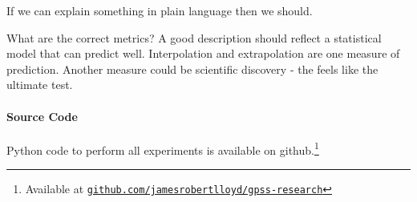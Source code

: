 \documentclass{article}
\begin{document}
If we can explain something in plain language then we should.

What are the correct metrics?
A good description should reflect a statistical model that can predict well.
Interpolation and extrapolation are one measure of prediction.
Another measure could be scientific discovery - the feels like the ultimate test.

\paragraph{Source Code}
Python code to perform all experiments is available on github.\footnote{Available at 
\href{http://www.github.com/jamesrobertlloyd/gpss-research}
{\texttt{github.com/jamesrobertlloyd/gpss-research}}}







\end{document}
